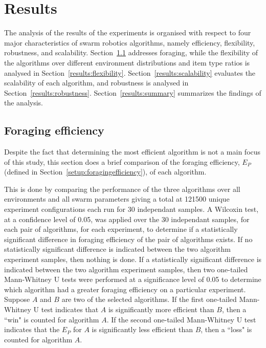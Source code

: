 \chapter{Results}
\label{chap:results}

The analysis of the results of the experiments is organised with respect to four major characteristics of swarm robotics algorithms, namely efficiency, flexibility, robustness, and scalability. Section~\ref{results:efficiency} addresses foraging, while the flexibility of the algorithms over different environment distributions and item type ratios is analysed in Section~\ref{results:flexibility}. Section~\ref{results:scalability} evaluates the scalability of each algorithm, and robustness is analysed in Section~\ref{results:robustness}. Section~\ref{results:summary} summarizes the findings of the analysis.

\section{Foraging efficiency}
\label{results:efficiency}


Despite the fact that determining the most efficient algorithm is not a main focus of this study, this section does a brief comparison of the foraging efficiency, $E_P$ (defined in Section~\ref{setup:foragingefficiency}), of each algorithm. 

This is done by comparing the performance of the three algorithms over all environments and all swarm parameters giving a total at 121500 unique experiment configurations each run for 30 independant samples. A Wilcoxin test, at a confidence level of 0.05, was applied over the 30 independant samples, for each pair of algorithms, for each experiment, to determine if a statistically significant difference in foraging efficiency of the pair of algorithms exists. If no statistically significant difference is indicated between the two algorithm experiment samples, then nothing is done. If a statistically significant difference is indicated between the two algorithm experiment samples, then two one-tailed Mann-Whitney U tests were performed at a significance level of 0.05 to determine which algorithm had a greater foraging efficiency on a particular experiment. Suppose $A$ and $B$ are two of the selected algorithms. If the first one-tailed Mann-Whitney U test indicates that $A$ is significantly more efficient than $B$, then a ``win" is counted for algorithm $A$. If the second one-tailed Mann-Whitney U test indicates that the $E_P$ for $A$ is significantly less efficient than $B$, then a ``loss" is counted for algorithm $A$. 

